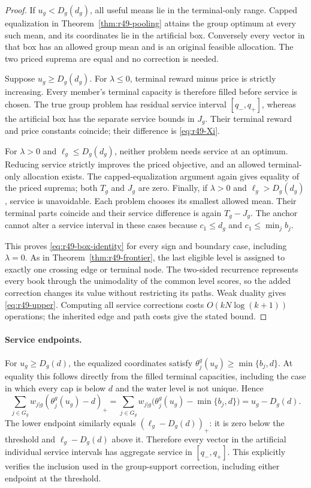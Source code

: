 \begin{proof}
If $u_g<D_g(d_g)$, all useful means lie in the terminal-only range. Capped equalization in Theorem~\ref{thm:r49-pooling} attains the group optimum at every such mean, and its coordinates lie in the artificial box. Conversely every vector in that box has an allowed group mean and is an original feasible allocation. The two priced suprema are equal and no correction is needed.

Suppose $u_g\geq D_g(d_g)$. For $\lambda\leq0$, terminal reward minus price is strictly increasing. Every member's terminal capacity is therefore filled before service is chosen. The true group problem has residual service interval $[q_-,q_+]$, whereas the artificial box has the separate service bounds in $J_g$. Their terminal reward and price constants coincide; their difference is \eqref{eq:r49-Xi}.

For $\lambda>0$ and $\ell_g\leq D_g(d_g)$, neither problem needs service at an optimum. Reducing service strictly improves the priced objective, and an allowed terminal-only allocation exists. The capped-equalization argument again gives equality of the priced suprema; both $T_g$ and $J_g$ are zero. Finally, if $\lambda>0$ and $\ell_g>D_g(d_g)$, service is unavoidable. Each problem chooses its smallest allowed mean. Their terminal parts coincide and their service difference is again $T_g-J_g$. The anchor cannot alter a service interval in these cases because $c_1\leq d_g$ and $c_1\leq\min_jb_j$.

This proves \eqref{eq:r49-box-identity} for every sign and boundary case, including $\lambda=0$. As in Theorem~\ref{thm:r49-frontier}, the last eligible level is assigned to exactly one crossing edge or terminal node. The two-sided recurrence represents every book through the unimodality of the common level scores, so the added correction changes its value without restricting its paths. Weak duality gives \eqref{eq:r49-upper}. Computing all service corrections costs $O(kN\log(k+1))$ operations; the inherited edge and path costs give the stated bound.\end{proof}

\paragraph{Service endpoints.}
For $u_g\geq D_g(d)$, the equalized coordinates satisfy $\theta_j^g(u_g)\geq\min\{b_j,d\}$. At equality this follows directly from the filled terminal capacities, including the case in which every cap is below $d$ and the water level is not unique. Hence
\[
 \sum_{j\in G_g}w_{j|g}(\theta_j^g(u_g)-d)_+
 =\sum_{j\in G_g}w_{j|g}\bigl(\theta_j^g(u_g)-\min\{b_j,d\}\bigr)
 =u_g-D_g(d).
\]
The lower endpoint similarly equals $(\ell_g-D_g(d))_+$: it is zero below the threshold and $\ell_g-D_g(d)$ above it. Therefore every vector in the artificial individual service intervals has aggregate service in $[q_-,q_+]$. This explicitly verifies the inclusion used in the group-support correction, including either endpoint at the threshold.

